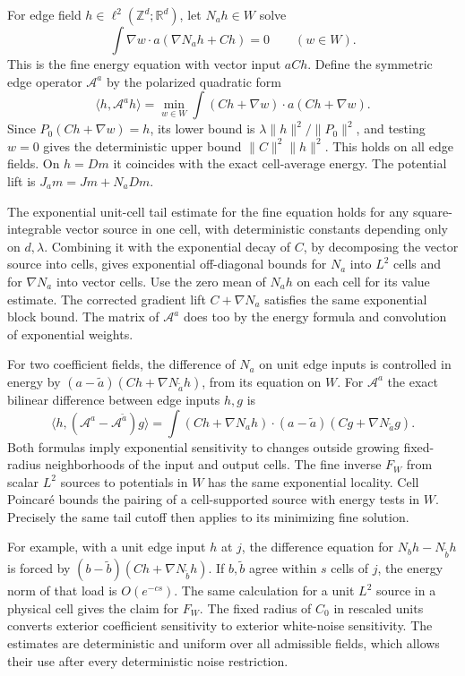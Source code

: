 \documentclass[11pt]{article}
\begin{document}
For edge field \(h\in\ell^2(\mathbb Z^d;\mathbb R^d)\), let \(N_a h\in W\) solve \[
\int\nabla w\cdot a(\nabla N_a h+C h)=0\qquad(w\in W).
\] This is the fine energy equation with vector input \(a C h\). Define the symmetric edge operator \(\mathcal A^a\) by the polarized quadratic form \[
\langle h,\mathcal A^a h\rangle
 =\min_{w\in W}\int (C h+\nabla w)\cdot a(C h+\nabla w).
\] Since \(P_0(C h+\nabla w)=h\), its lower bound is \(\lambda\|h\|^2/\|P_0\|^2\), and testing \(w=0\) gives the deterministic upper bound \(\|C\|^2\|h\|^2\). This holds on all edge fields. On \(h=Dm\) it coincides with the exact cell-average energy. The potential lift is \(J_a m=Jm+N_a Dm\).

The exponential unit-cell tail estimate for the fine equation holds for any square-integrable vector source in one cell, with deterministic constants depending only on \(d,\lambda\). Combining it with the exponential decay of \(C\), by decomposing the vector source into cells, gives exponential off-diagonal bounds for \(N_a\) into \(L^2\) cells and for \(\nabla N_a\) into vector cells. Use the zero mean of \(N_a h\) on each cell for its value estimate. The corrected gradient lift \(C+\nabla N_a\) satisfies the same exponential block bound. The matrix of \(\mathcal A^a\) does too by the energy formula and convolution of exponential weights.

For two coefficient fields, the difference of \(N_a\) on unit edge inputs is controlled in energy by \((a-\tilde a)(C h+\nabla N_{\tilde a}h)\), from its equation on \(W\). For \(\mathcal A^a\) the exact bilinear difference between edge inputs \(h,g\) is \[
\langle h,(\mathcal A^a-\mathcal A^{\tilde a})g\rangle
=\int (C h+\nabla N_a h)\cdot(a-\tilde a)(C g+\nabla N_{\tilde a}g).
\] Both formulas imply exponential sensitivity to changes outside growing fixed-radius neighborhoods of the input and output cells. The fine inverse \(F_W\) from scalar \(L^2\) sources to potentials in \(W\) has the same exponential locality. Cell Poincaré bounds the pairing of a cell-supported source with energy tests in \(W\). Precisely the same tail cutoff then applies to its minimizing fine solution.

For example, with a unit edge input \(h\) at \(j\), the difference equation for \(N_bh-N_{\tilde b}h\) is forced by \((b-\tilde b)(Ch+\nabla N_{\tilde b}h)\). If \(b,\tilde b\) agree within \(s\) cells of \(j\), the energy norm of that load is \(O(e^{-cs})\). The same calculation for a unit \(L^2\) source in a physical cell gives the claim for \(F_W\). The fixed radius of \(C_0\) in rescaled units converts exterior coefficient sensitivity to exterior white-noise sensitivity. The estimates are deterministic and uniform over all admissible fields, which allows their use after every deterministic noise restriction.
\end{document}
